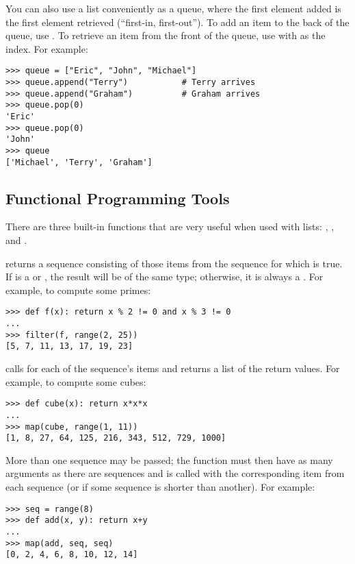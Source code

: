 \documentclass{manual}
\begin{document}
You can also use a list conveniently as a queue, where the first
element added is the first element retrieved (``first-in,
first-out'').  To add an item to the back of the queue, use
.  To retrieve an item from the front of the queue,
use  with  as the index.  For example:

\begin{verbatim}
>>> queue = ["Eric", "John", "Michael"]
>>> queue.append("Terry")           # Terry arrives
>>> queue.append("Graham")          # Graham arrives
>>> queue.pop(0)
'Eric'
>>> queue.pop(0)
'John'
>>> queue
['Michael', 'Terry', 'Graham']
\end{verbatim}


\subsection{Functional Programming Tools \label{functional}}

There are three built-in functions that are very useful when used with
lists: , , and .

 returns a sequence
consisting of those items from the
sequence for which  is true.
If  is a  or , the result will
be of the same type; otherwise, it is always a .
For example, to compute some primes:

\begin{verbatim}
>>> def f(x): return x % 2 != 0 and x % 3 != 0
...
>>> filter(f, range(2, 25))
[5, 7, 11, 13, 17, 19, 23]
\end{verbatim}

 calls
 for each of the sequence's items and
returns a list of the return values.  For example, to compute some
cubes:

\begin{verbatim}
>>> def cube(x): return x*x*x
...
>>> map(cube, range(1, 11))
[1, 8, 27, 64, 125, 216, 343, 512, 729, 1000]
\end{verbatim}

More than one sequence may be passed; the function must then have as
many arguments as there are sequences and is called with the
corresponding item from each sequence (or  if some sequence
is shorter than another).  For example:

\begin{verbatim}
>>> seq = range(8)
>>> def add(x, y): return x+y
...
>>> map(add, seq, seq)
[0, 2, 4, 6, 8, 10, 12, 14]
\end{verbatim}
\end{document}
